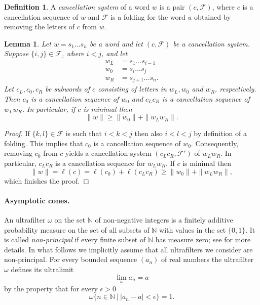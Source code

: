 \documentclass[12pt,reqno,a4paper]{article}
\newtheorem{lemma}[theorem]{Lemma}
\theoremstyle{definition}
\newtheorem{definition}[theorem]{Definition}
\theoremstyle{remark}
\numberwithin{equation}{section}
\numberwithin{figure}{section}
\newcommand{\C}[1]{{\mathscr #1}}
\begin{document}
\begin{definition}
A {\em cancellation system} of a word $w$ is a pair $(c,\C F)$, where
$c$ is a cancellation sequence of $w$ and $\C F$ is a folding for
the word $u$ obtained by removing the letters of $c$ from $w$.
\end{definition}

\begin{lemma}\label{L:folding}
Let $w=s_1\dots s_n$ be a word and let $(c,\C F)$ be a cancellation system.
Suppose $\{i,j\}\in \C F$, where $i<j$, and let
\begin{align*}
w_L&=s_1\dots s_{i-1}\\
w_0&=s_i\dots s_{j}\\
w_R&=s_{j+1}\dots s_{n}.
\end{align*}
Let $c_L,c_0,c_R$ be subwords of $c$ consisting of letters in
$w_L,w_0$ and $w_R$, respectively.
Then $c_0$ is a cancellation sequence of $w_0$ and $c_Lc_R$ is a cancellation
sequence of $w_Lw_R$. In particular, if $c$ is minimal then
$$
\|w\| \geq \|w_0\| + \|w_Lw_R\|.
$$
\end{lemma}
\begin{proof}
If $\{k,l\} \in \C F$ is such that $i<k<j$ then also $i<l<j$ by definition
of a folding. This implies that $c_0$ is a cancellation sequence of $w_0$.
Consequently, removing $c_0$ from $c$ yields a cancellation system
$(c_Lc_R,\C F')$ of $w_Lw_R$. In particular, $c_Lc_R$ is a cancellation
sequence for $w_Lw_R$. If $c$ is minimal then
$$
\|w\| = \ell(c) = \ell(c_0)+\ell(c_Lc_R) \geq \|w_0\|+\|w_Lw_R\|,
$$
which finishes the proof.
\end{proof}


\paragraph{Asymptotic cones.}\label{PA:acones}
An ultrafilter $\omega$ on the set $\mathbb N$ of non-negative integers 
is a finitely additive probability measure on the set of all subsets of $\mathbb N$ 
with values in the set $\{0,1\}$. 
It is called {\em non-principal} if every finite
subset of $\mathbb N$ has measure zero; see \cite[Section 7]{zbMATH06866242}
for more details. In what follows we implicitly assume that
all ultrafilters we consider are non-principal.
For every bounded sequence $(a_n)$ of
real numbers the ultrafilter $\omega$ defines its ultralimit 
$$
\lim_{\omega}a_n = a
$$
by the property that for every $\epsilon > 0$ 
$$
\omega\{n\in \mathbb N\ |\ |a_n-a|<\epsilon\} = 1.
$$
\end{document}
